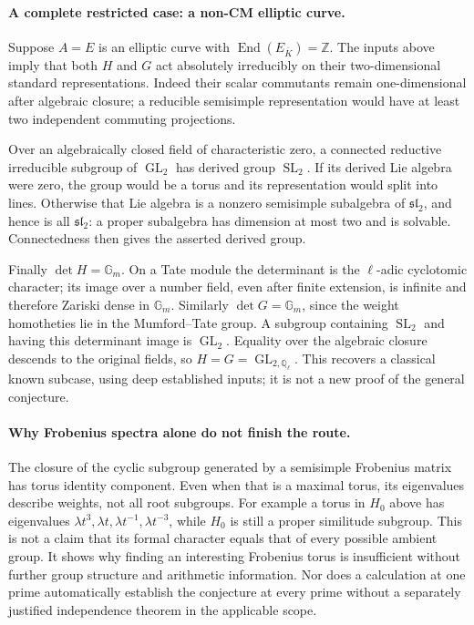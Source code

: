 \documentclass[11pt]{article}
\begin{document}
\paragraph{A complete restricted case: a non-CM elliptic curve.}
Suppose $A=E$ is an elliptic curve with
$\operatorname{End}(E_{\overline K})=\mathbb Z$. The inputs above imply
that both $H$ and $G$ act absolutely irreducibly on their two-dimensional
standard representations. Indeed their scalar commutants remain
one-dimensional after algebraic closure; a reducible semisimple
representation would have at least two independent commuting
projections.

Over an algebraically closed field of characteristic zero, a connected
reductive irreducible subgroup of $\operatorname{GL}_2$ has derived
group $\operatorname{SL}_2$. If its derived Lie algebra were zero, the
group would be a torus and its representation would split into lines.
Otherwise that Lie algebra is a nonzero semisimple subalgebra of
$\mathfrak{sl}_2$, and hence is all $\mathfrak{sl}_2$: a proper
subalgebra has dimension at most two and is solvable. Connectedness
then gives the asserted derived group.

Finally $\det H=\mathbb G_m$. On a Tate module the determinant is the
$\ell$-adic cyclotomic character; its image over a number field, even
after finite extension, is infinite and therefore Zariski dense in
$\mathbb G_m$. Similarly $\det G=\mathbb G_m$, since the weight
homotheties lie in the Mumford--Tate group. A subgroup containing
$\operatorname{SL}_2$ and having this determinant image is
$\operatorname{GL}_2$. Equality over the algebraic closure descends
to the original fields, so $H=G=\operatorname{GL}_{2,\mathbb Q_\ell}$.
This recovers a classical known subcase, using deep established
inputs; it is not a new proof of the general conjecture.

\paragraph{Why Frobenius spectra alone do not finish the route.}
The closure of the cyclic subgroup generated by a semisimple
Frobenius matrix has torus identity component. Even when that is a
maximal torus, its eigenvalues describe weights, not all root
subgroups. For example a torus in $H_0$ above has eigenvalues
$\lambda t^3,\lambda t,\lambda t^{-1},\lambda t^{-3}$, while $H_0$
is still a proper similitude subgroup. This is not a claim that its
formal character equals that of every possible ambient group.
It shows why finding an interesting Frobenius torus is insufficient
without further group structure and arithmetic information.
Nor does a calculation at one prime automatically establish the
conjecture at every prime without a separately justified independence
theorem in the applicable scope.
\end{document}
